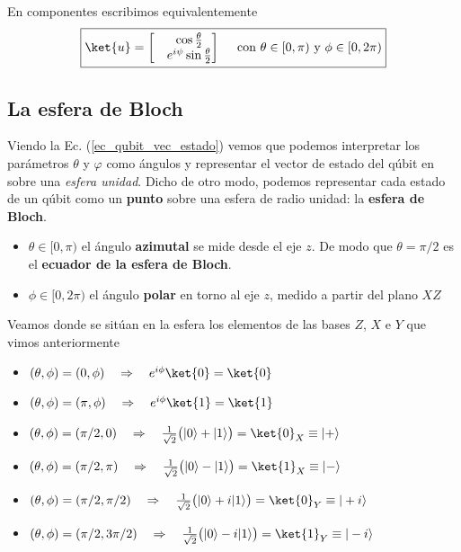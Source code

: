 \documentclass[a4paper,11pt]{book} %
\numberwithin{equation}{chapter}
\def\rqa{\quad \Rightarrow \quad}
\begin{document}
En componentes escribimos equivalentemente
	\begin{equation} \label{ec_qubit_vec_estado}
	\boxed{\ket{u} = \begin{bmatrix} & \cos \frac{\theta}{2} \\ & e^{i \psi}  \sin \frac{\theta}{2} \end{bmatrix}
	~~~~ \text{con } \theta\in [0,\pi) \text{ y } \phi\in [0,2\pi)}
	\end{equation}

 
        \subsection{La esfera de Bloch}
        
Viendo la Ec. (\ref{ec_qubit_vec_estado}) vemos que podemos interpretar los parámetros $\theta$ y $\varphi$ como ángulos y representar el vector de estado del qúbit en sobre una \textit{esfera unidad}. Dicho de otro modo, podemos representar  cada estado de un qúbit como un \textbf{punto }sobre una esfera de radio unidad: la \textbf{esfera de Bloch}.
	\begin{itemize}
		\item $\theta\in [0,\pi)$ el ángulo \textbf{azimutal} se mide desde el eje $z$. De modo que $\theta=\pi/2$ 
		es el \textbf{ecuador de la esfera de Bloch}.
		
		\item $\phi\in [0,2\pi)$ el ángulo \textbf{polar} en torno al eje $z$, medido a partir del plano $XZ$
	\end{itemize}

Veamos donde se sitúan en la esfera los elementos de las bases $Z$, $X$ e $Y$ que vimos anteriormente 
	\begin{itemize}
		\item $(\theta, \phi) = (0, \phi)   \rqa e^{i\phi}  \ket{0} = \ket{0}$
		\item $(\theta, \phi) = (\pi, \phi) \rqa e^{i \phi} \ket{1} = \ket{1}$
		\item $(\theta, \phi) = (\pi/2, 0)   \rqa \frac{1}{\sqrt{2}}\big(|0\rangle+|1\rangle \big) =\ket{0}_X \equiv |+\rangle$
		\item $(\theta, \phi) = (\pi/2, \pi) \rqa \frac{1}{\sqrt{2}}\big(|0\rangle-|1\rangle \big)=\ket{1}_X \equiv |-\rangle $
		\item $(\theta, \phi) = (\pi/2, \pi/2) \rqa \frac{1}{\sqrt{2}}\big( |0\rangle +i|1\rangle\big) =\ket{0}_Y \equiv  |+i \rangle $
		\item $(\theta, \phi) = (\pi/2, 3\pi/2) \rqa \frac{1}{\sqrt{2}}\big(|0\rangle-i|1\rangle\big) = \ket{1}_Y \equiv  |-i\rangle $
	\end{itemize}
\end{document}

